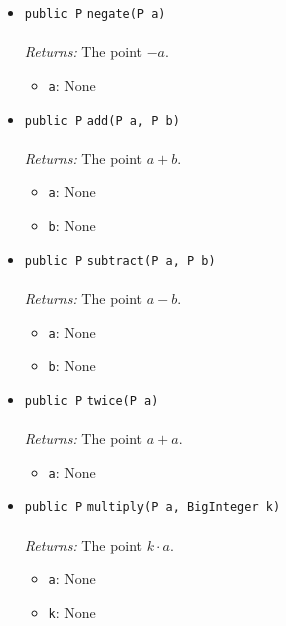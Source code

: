 \begin{itemize}
\item \lstinline|public P| \lstinline|negate|\lstinline|(P a)|\\ \\[-0.6em]
\emph{Returns:} The point $-a$.
\begin{itemize}
\item \lstinline|a|: None
\end{itemize}



\item \lstinline|public P| \lstinline|add|\lstinline|(P a, P b)|\\ \\[-0.6em]
\emph{Returns:} The point $a + b$.
\begin{itemize}
\item \lstinline|a|: None
\item \lstinline|b|: None
\end{itemize}



\item \lstinline|public P| \lstinline|subtract|\lstinline|(P a, P b)|\\ \\[-0.6em]
\emph{Returns:} The point $a - b$.
\begin{itemize}
\item \lstinline|a|: None
\item \lstinline|b|: None
\end{itemize}



\item \lstinline|public P| \lstinline|twice|\lstinline|(P a)|\\ \\[-0.6em]
\emph{Returns:} The point $a + a$.
\begin{itemize}
\item \lstinline|a|: None
\end{itemize}



\item \lstinline|public P| \lstinline|multiply|\lstinline|(P a, BigInteger k)|\\ \\[-0.6em]
\emph{Returns:} The point $k \cdot a$.
\begin{itemize}
\item \lstinline|a|: None
\item \lstinline|k|: None
\end{itemize}



\end{itemize}

